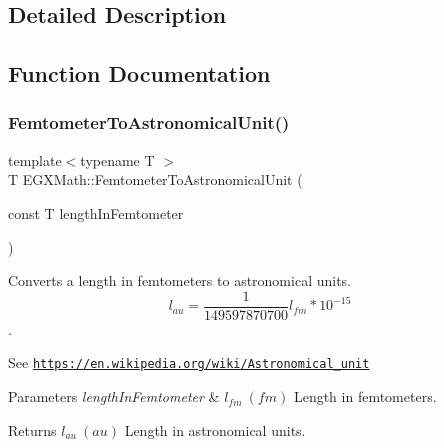 \subsection{Detailed Description}


\subsection{Function Documentation}
\mbox{\label{group___e_g_x_math-_conversions-_length_conversions-_femtometer-_astronomical_ga9c379bc2a0ed6ff83f0d545bab48e909}} 
\subsubsection{\texorpdfstring{Femtometer\+To\+Astronomical\+Unit()}{FemtometerToAstronomicalUnit()}}
{\footnotesize\ttfamily template$<$typename T $>$ \\
T E\+G\+X\+Math\+::\+Femtometer\+To\+Astronomical\+Unit (\begin{DoxyParamCaption}\item[{const T}]{length\+In\+Femtometer }\end{DoxyParamCaption})}



Converts a length in femtometers to astronomical units. \[ l_{au}= \frac{1}{149597870700} l_{fm} * 10^{-15} \]. 

See \href{https://en.wikipedia.org/wiki/Astronomical_unit}{\tt https\+://en.\+wikipedia.\+org/wiki/\+Astronomical\+\_\+unit} 
\begin{DoxyParams}{Parameters}
{\em length\+In\+Femtometer} & $ l_{fm}\ (fm)$ Length in femtometers. \\
\hline
\end{DoxyParams}
\begin{DoxyReturn}{Returns}
$ l_{au}\ (au)$ Length in astronomical units. 
\end{DoxyReturn}
\mbox{\label{group___e_g_x_math-_conversions-_length_conversions-_femtometer-_astronomical_gaae002ed0894f79e0fa6889732d52e01d}} 
